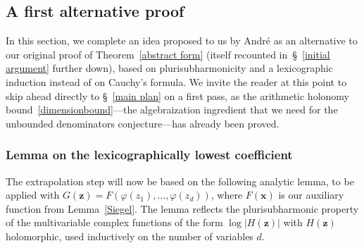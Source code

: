 \documentclass[10pt]{amsart}
\def\SSSS{\S}
\theoremstyle{remark}
\numberwithin{equation}{subsection}
\begin{document}
\subsection{A first alternative proof} \label{psh approach} In this section, we complete an idea proposed to us by Andr\'e as an alternative to our original proof of  Theorem~\ref{abstract form} (itself recounted in~\SSSS~\ref{initial argument} further down), based on  plurisubharmonicity and a lexicographic induction instead of on Cauchy's formula. 
We invite the reader at this point to skip ahead  directly to \SSSS~\ref{main plan} on a first pass, as the arithmetic holonomy bound~\eqref{dimensionbound}---the algebraization ingredient that we need for the unbounded denominators conjecture---has already been proved. 

\subsubsection{Lemma on the lexicographically lowest coefficient}\label{lem_lexi}
 The  extrapolation step will now be based on the following analytic lemma, to be applied with $G(\mathbf{z}) = F(\varphi(z_1), \ldots, \varphi(z_d))$, where $F(\mathbf{x})$ is our auxiliary function from Lemma~\ref{Siegel}. The lemma reflects the plurisubharmonic property of the multivariable complex functions of the form $\log{|H(\mathbf{z})|}$ with $H(\mathbf{z})$ holomorphic, used inductively on the number of variables $d$. %
\end{document}

